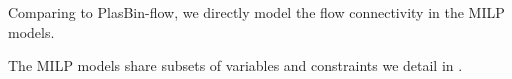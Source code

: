 \begin{newfeatbox}
  Comparing to PlasBin-flow, we directly model the flow connectivity in the MILP models.
\end{newfeatbox}

The MILP models share subsets of variables and constraints we detail in .

%
%




%
%






%
%
